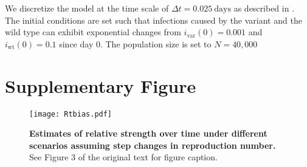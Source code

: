 \documentclass[12pt]{article}
\newcommand{\vvvar}{\mathrm{var}}
\newcommand{\wwwt}{\mathrm{wt}}
\newcommand{\ix}[1]{\ensuremath{{i}_{#1}}\xspace}
\newcommand{\iw}{\ix{\wwwt}}
\newcommand{\iv}{\ix{\vvvar}}
\begin{document}
We discretize the model at the time scale of $\Delta t =0.025\ \textrm{days}$ as described in \cite{park2021forward}.
The initial conditions are set such that infections caused by the variant and the wild type can exhibit exponential changes from $\iv(0) = 0.001$ and $\iw(0) = 0.1$ since day 0.
The population size is set to $N=40,000$

\pagebreak

\section*{Supplementary Figure}

\setcounter{figure}{0}    
\renewcommand\thefigure{S\arabic{figure}}    

\begin{figure}[!pht]
\begin{center}
\texttt{[image: Rtbias.pdf]}
\caption{
\textbf{Estimates of relative strength over time under different scenarios assuming step changes in reproduction number.}
See Figure 3 of the original text for figure caption.
}
\end{center}
\end{figure}


\pagebreak


\end{document}
